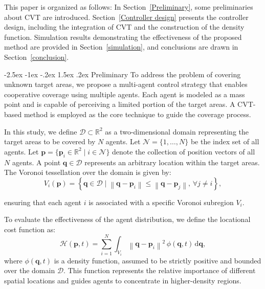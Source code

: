 \documentclass[fleqn,10pt,twocolumn]{main}
\makeatletter
\renewcommand\section{\@startsection{section}{1}{\z@}
  {-2.5ex \@plus -1ex \@minus -.2ex}
  {1.5ex \@plus .2ex}
  {\centering\normalfont\Large\bfseries}}
\makeatother
\begin{document}
This paper is organized as follows: In Section~\ref{Preliminary}, some preliminaries about CVT are introduced. Section~\ref{Controller design} presents the controller design, including the integration of CVT and the construction of the density function. Simulation results demonstrating the effectiveness of the proposed method are provided in Section~\ref{simulation}, and conclusions are drawn in Section~\ref{conclusion}.

\section{Preliminary} \label{Preliminary}
To address the problem of covering unknown target areas, we propose a multi-agent control strategy that enables cooperative coverage using multiple agents. Each agent is modeled as a mass point and is capable of perceiving a limited portion of the target areas. A CVT-based method is employed as the core technique to guide the coverage process.


In this study, we define $\mathcal{D} \subset \mathbb{R}^2$ as a two-dimensional domain representing the target areas to be covered by $N$ agents. Let \(\mathcal{N} = \{1, \dots, N\}\) be the index set of all agents. Let $\boldsymbol{p} = \{ \boldsymbol{p}_i \in \mathbb{R}^2 \mid i \in \mathcal{N} \}$ denote the collection of position vectors of all $N$ agents. A point $\boldsymbol{q} \in \mathcal{D}$ represents an arbitrary location within the target areas. The Voronoi tessellation over the domain is given by:
\begin{equation}\label{voronoi}
V_{i}\left ( \boldsymbol{p} \right )= \left \{ \boldsymbol{q} \in \mathcal{D} \mid \left \| \boldsymbol{q} - \boldsymbol{p}_i \right \| \leq \left \| \boldsymbol{q} - \boldsymbol{p}_j \right \|,\, \forall j \neq i \right \},
\end{equation}

ensuring that each agent $i$ is associated with a specific Voronoi subregion $V_i$.

To evaluate the effectiveness of the agent distribution, we define the locational cost function as:
\begin{equation}\label{H0}
\mathcal{H}(\boldsymbol{p}, t) = \sum_{i=1}^{N} \int_{V_i} \left \| \boldsymbol{q} - \boldsymbol{p}_i \right \|^2 \, \phi(\boldsymbol{q}, t) \, \mathrm{d} \boldsymbol{q},
\end{equation}
where $\phi(\boldsymbol{q}, t)$ is a density function, assumed to be strictly positive and bounded over the domain $\mathcal{D}$. This function represents the relative importance of different spatial locations and guides agents to concentrate in higher-density regions.
\end{document}
